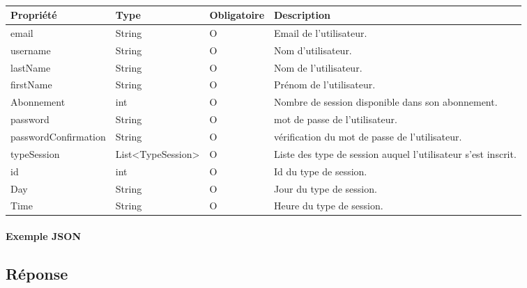 		\paragraph{}
			\begin{center}
				\begin{tabularx}{\textwidth}{| T{0.2122\textwidth} | S{0.22\textwidth} | S{0.15\textwidth} | S{0.3\textwidth} |}
					\hline
					Propriété & Type & Obligatoire & Description \\
					\hline
					email & String & O & Email de l'utilisateur. \\
					\hline
					username & String & O & Nom d'utilisateur. \\
					\hline
					lastName & String & O & Nom de l'utilisateur. \\
					\hline
					firstName & String & O & Prénom de l'utilisateur. \\
					\hline
					Abonnement & int & O & Nombre de session disponible dans son abonnement. \\
					\hline
					password & String & O & mot de passe de l'utilisateur. \\
					\hline
					passwordConfirmation & String & O & vérification du mot de passe de l'utilisateur. \\
					\hline
					typeSession & List<TypeSession> & O & Liste des type de session auquel l'utilisateur s'est inscrit.\\
					\hline
					
					\hline
					
					\hline
					id & int & O & Id du type de session. \\
					\hline
					Day & String & O & Jour du type de session. \\
					\hline
					Time & String & O & Heure du type de session. \\
					\hline
				\end{tabularx}
			\end{center}
		
		\newpage
		\paragraph{Exemple JSON}
			\paragraph{}
			

\subsection{Réponse}
